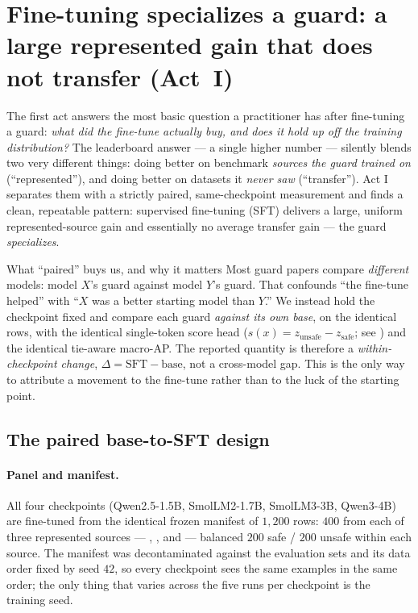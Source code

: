 \section{Fine-tuning specializes a guard: a large represented gain that does not transfer (Act~I)}
\label{sec:actI}

The first act answers the most basic question a practitioner has after fine-tuning a guard:
\emph{what did the fine-tune actually buy, and does it hold up off the training distribution?} The
leaderboard answer --- a single higher number --- silently blends two very different things: doing
better on benchmark \emph{sources the guard trained on} (``represented''), and doing better on
datasets it \emph{never saw} (``transfer''). Act I separates them with a strictly paired,
same-checkpoint measurement and finds a clean, repeatable pattern: supervised fine-tuning (SFT)
delivers a large, uniform represented-source gain and essentially no average transfer gain --- the
guard \emph{specializes}.

\begin{background}{What ``paired'' buys us, and why it matters}
Most guard papers compare \emph{different} models: model $X$'s guard against model $Y$'s guard. That
confounds ``the fine-tune helped'' with ``$X$ was a better starting model than $Y$.'' We instead hold
the checkpoint fixed and compare each guard \emph{against its own base}, on the identical rows, with
the identical single-token score head ($s(x)=z_{\text{unsafe}}-z_{\text{safe}}$; see
) and the identical tie-aware macro-AP. The reported quantity is therefore a
\emph{within-checkpoint change}, $\Delta = \text{SFT} - \text{base}$, not a cross-model gap. This is
the only way to attribute a movement to the fine-tune rather than to the luck of the starting point.
\end{background}

\subsection{The paired base-to-SFT design}
\label{sec:actI-design}

\paragraph{Panel and manifest.} All four checkpoints (Qwen2.5-1.5B, SmolLM2-1.7B, SmolLM3-3B,
Qwen3-4B) are fine-tuned from the identical frozen manifest of $1{,}200$ rows: $400$ from each of three
represented sources --- , , and
 --- balanced $200$ safe / $200$ unsafe within each source. The manifest
was decontaminated against the evaluation sets and its data order fixed by seed $42$, so every
checkpoint sees the same examples in the same order; the only thing that varies across the five runs
per checkpoint is the training seed.

